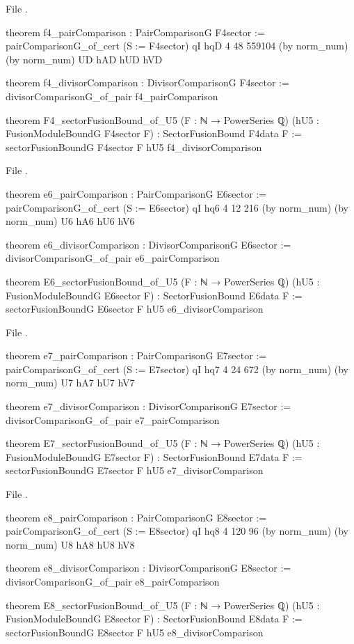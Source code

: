 \noindent File .
\begin{leancode}
theorem f4_pairComparison : PairComparisonG F4sector :=
  pairComparisonG_of_cert (S := F4sector) qI hqD 4 48 559104 (by norm_num) (by norm_num) UD hAD hUD hVD

theorem f4_divisorComparison : DivisorComparisonG F4sector :=
  divisorComparisonG_of_pair f4_pairComparison

theorem F4_sectorFusionBound_of_U5 (F : ℕ → PowerSeries ℚ) (hU5 : FusionModuleBoundG F4sector F) :
    SectorFusionBound F4data F :=
  sectorFusionBoundG F4sector F hU5 f4_divisorComparison
\end{leancode}
\noindent File .
\begin{leancode}
theorem e6_pairComparison : PairComparisonG E6sector :=
  pairComparisonG_of_cert (S := E6sector) qI hq6 4 12 216 (by norm_num) (by norm_num) U6 hA6 hU6 hV6

theorem e6_divisorComparison : DivisorComparisonG E6sector :=
  divisorComparisonG_of_pair e6_pairComparison

theorem E6_sectorFusionBound_of_U5 (F : ℕ → PowerSeries ℚ) (hU5 : FusionModuleBoundG E6sector F) :
    SectorFusionBound E6data F :=
  sectorFusionBoundG E6sector F hU5 e6_divisorComparison
\end{leancode}
\noindent File .
\begin{leancode}
theorem e7_pairComparison : PairComparisonG E7sector :=
  pairComparisonG_of_cert (S := E7sector) qI hq7 4 24 672 (by norm_num) (by norm_num) U7 hA7 hU7 hV7

theorem e7_divisorComparison : DivisorComparisonG E7sector :=
  divisorComparisonG_of_pair e7_pairComparison

theorem E7_sectorFusionBound_of_U5 (F : ℕ → PowerSeries ℚ) (hU5 : FusionModuleBoundG E7sector F) :
    SectorFusionBound E7data F :=
  sectorFusionBoundG E7sector F hU5 e7_divisorComparison
\end{leancode}
\noindent File .
\begin{leancode}
theorem e8_pairComparison : PairComparisonG E8sector :=
  pairComparisonG_of_cert (S := E8sector) qI hq8 4 120 96 (by norm_num) (by norm_num) U8 hA8 hU8 hV8

theorem e8_divisorComparison : DivisorComparisonG E8sector :=
  divisorComparisonG_of_pair e8_pairComparison

theorem E8_sectorFusionBound_of_U5 (F : ℕ → PowerSeries ℚ) (hU5 : FusionModuleBoundG E8sector F) :
    SectorFusionBound E8data F :=
  sectorFusionBoundG E8sector F hU5 e8_divisorComparison
\end{leancode}

